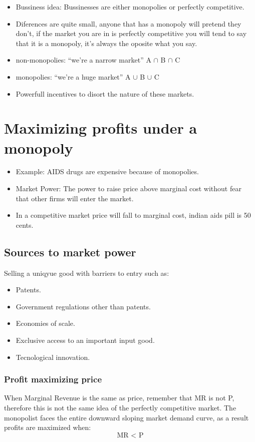 \documentclass{article}
\begin{document}
\begin{itemize}
    \item Bussiness idea: Bussinesses are either monopolies or perfectly competitive. 
    \item Diferences are quite small, anyone that has a monopoly will pretend they don't, if the market you are in is perfectly competitive you will tend to say that it is a monopoly, it's always the oposite what you say.
    \item non-monopolies: ``we're a narrow market'' A $\cap $ B $\cap$ C 
    \item monopolies: ``we're a huge market'' A $\cup $ B $\cup $  C
    \item Powerfull incentives to disort the nature of these markets.
\end{itemize}


\section{Maximizing profits under a monopoly}
\begin{itemize}
    \item Example: AIDS drugs are expensive because of monopolies.
    \item Market Power: The power to raise price above marginal cost without fear that other firms will enter the market. 
    \item In a competitive market price will fall to marginal cost, indian aids pill is 50 cents.
\end{itemize}
\subsection{Sources to market power}
Selling a uniqyue good with barriers to entry such as:
\begin{itemize}
    \item Patents.
    \item Government regulations other than patents. 
    \item Economies of scale.
    \item Exclusive access to an important input good. 
    \item Tecnological innovation. 
\end{itemize}
\subsubsection{Profit maximizing price}
When Marginal Revenue is the same as price, remember that MR is not P, therefore this is not the same idea of the perfectly competitive market. 
The monopolist faces the entire downward sloping market demand curve, as a result profits are maximized when: 
\[
  \text{ MR } < \text{ P }
\]
\end{document}
